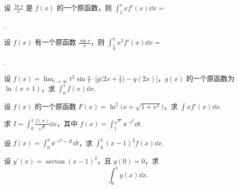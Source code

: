 	\begin{ti}
		设 $\frac{\ln x}{x}$ 是 $f(x)$ 的一个原函数，则 $\int_{1}^{\ee} x f'(x) \dd{x} = $
		
		\noindent{}.
	\end{ti}

	\begin{ti}
		设 $f(x)$ 有一个原函数 $\frac{\sin x}{x}$，则 $\int_{\frac{\uppi}{2}}^{\uppi} x^{3} f'(x) \dd{x} = $
		
		\noindent\hone{4}.
	\end{ti}

	\begin{ti}
		设 $f(x) = \lim_{t \to \infty} t^{2} \sin \frac{x}{t} \cdot \bigl[ g\bigl( 2x + \frac{1}{t} \bigr) - g(2x) \bigr]$，$g(x)$ 的一个原函数为 $\ln(x + 1)$，求 $\int_{0}^{1} f(x) \dd{x}$.
	\end{ti}

	\begin{ti}
		设 $f(x)$ 的一个原函数 $F(x) = \ln^{2}\bigl( x + \sqrt{1 + x^{2}} \bigr)$，求 $\int x f'(x) \dd{x}$.
	\end{ti}

	\begin{ti}
		求 $I = \int_{0}^{1} \frac{f(x)}{\sqrt{x}} \dd{x}$，其中 $f(x) = \int_{1}^{\sqrt{x}} \ee^{-t^{2}} \dd{t}$.
	\end{ti}

	\begin{ti}
		设 $f(x) = \int_{0}^{x} \ee^{-t^{2} + 2t} \dd{t}$，求 $\int_{0}^{1} (x - 1)^{2} f(x) \dd{x}$.
	\end{ti}

	\begin{ti}
		设 $y'(x) = \arctan (x - 1)^{2}$，且 $y(0) = 0$，求
		\[
			\int_{0}^{1} y(x) \dd{x}.
		\]
	\end{ti}